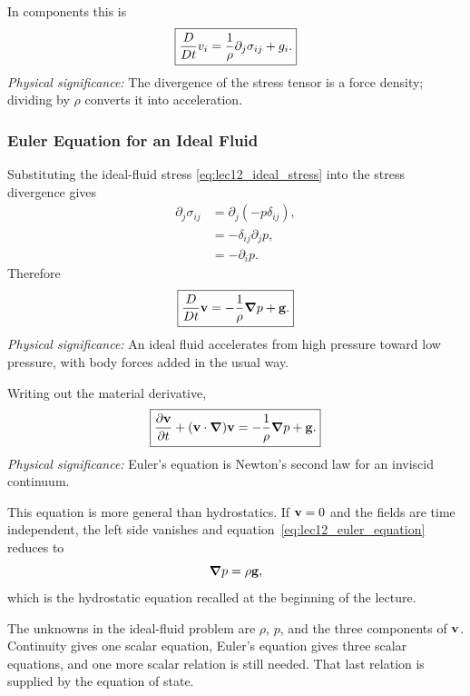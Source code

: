 \documentclass[../main.tex]{subfiles}
\begin{document}
In components this is
\begin{equation}
  \boxed{
  \frac{D}{Dt} v_i
  =
  \frac{1}{\rho}\partial_j\sigma_{ij}+g_i.}
  \label{eq:lec12_general_momentum_components}
\end{equation}
\textit{Physical significance:} The divergence of the stress tensor is a force density; dividing by $\rho$ converts it into acceleration.

\subsubsection{Euler Equation for an Ideal Fluid}\label{subsec:lec12:euler-ideal}
Substituting the ideal-fluid stress \eqref{eq:lec12_ideal_stress} into the stress divergence gives
\begin{align}
  \partial_j\sigma_{ij}
  &=
  \partial_j(-p\delta_{ij}),
  \label{eq:lec12_pressure_divergence_1}\\
  &=
  -\delta_{ij}\partial_j p,
  \label{eq:lec12_pressure_divergence_2}\\
  &=
  -\partial_i p.
  \label{eq:lec12_pressure_divergence_3}
\end{align}
Therefore
\begin{equation}
  \boxed{
  \frac{D}{Dt}\mathbf{v}
  =
  -\frac{1}{\rho}\grad p+\mathbf{g}.}
  \label{eq:lec12_euler_material}
\end{equation}
\textit{Physical significance:} An ideal fluid accelerates from high pressure toward low pressure, with body forces added in the usual way.

Writing out the material derivative,
\begin{equation}
  \boxed{
  \pdv{\mathbf{v}}{t}
  +
  (\mathbf{v}\cdot\grad)\mathbf{v}
  =
  -\frac{1}{\rho}\grad p+\mathbf{g}.}
  \label{eq:lec12_euler_equation}
\end{equation}
\textit{Physical significance:} Euler's equation is Newton's second law for an inviscid continuum.

This equation is more general than hydrostatics. If $\mathbf{v}=0$ and the fields are time independent, the left side vanishes and equation~\eqref{eq:lec12_euler_equation} reduces to
\begin{equation}
  \grad p=\rho\mathbf{g},
  \label{eq:lec12_euler_hydrostatic_limit}
\end{equation}
which is the hydrostatic equation recalled at the beginning of the lecture.

The unknowns in the ideal-fluid problem are $\rho$, $p$, and the three components of $\mathbf{v}$. Continuity gives one scalar equation, Euler's equation gives three scalar equations, and one more scalar relation is still needed. That last relation is supplied by the equation of state.
\end{document}

